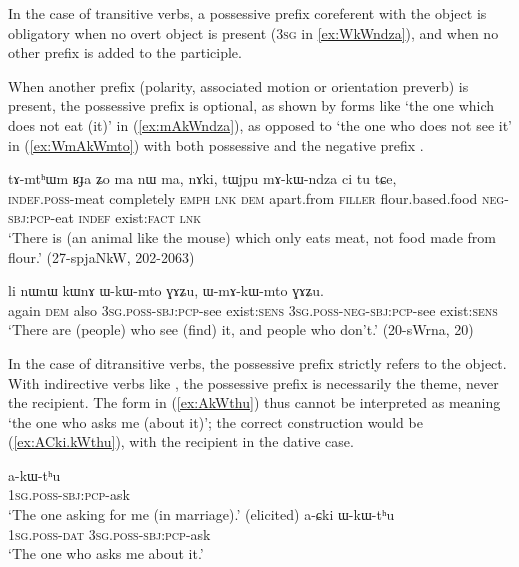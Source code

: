 In the case of transitive verbs, a possessive prefix coreferent with the object is obligatory when no overt object is present (\textsc{3sg}  in \ref{ex:WkWndza}), and when no other prefix is added to the participle.

When another prefix (polarity, associated motion or orientation preverb) is present, the possessive prefix is optional, as shown by forms like  `the one which does not eat (it)' in (\ref{ex:mAkWndza}), as opposed to  `the one who does not see it' in (\ref{ex:WmAkWmto}) with both possessive  and the negative prefix .

 \begin{exe} 
\ex \label{ex:mAkWndza}
\gll  tɤ-mtʰɯm ʁɟa ʑo ma nɯ ma, nɤki, tɯjpu mɤ-kɯ-ndza ci tu tɕe, \\
\textsc{indef}.\textsc{poss}-meat completely \textsc{emph} \textsc{lnk} \textsc{dem} apart.from \textsc{filler} flour.based.food \textsc{neg}-\textsc{sbj}:\textsc{pcp}-eat \textsc{indef} exist:\textsc{fact} \textsc{lnk} \\
\glt  `There is (an animal like the mouse) which only eats meat, not food made from flour.' (27-spjaNkW, 202-2063)
\end{exe}

 \begin{exe} 
\ex \label{ex:WmAkWmto} 
\gll  li nɯnɯ kɯnɤ ɯ-kɯ-mto ɣɤʑu, ɯ-mɤ-kɯ-mto ɣɤʑu. \\
again \textsc{dem} also \textsc{3sg}.\textsc{poss}-\textsc{sbj}:\textsc{pcp}-see exist:\textsc{sens} \textsc{3sg}.\textsc{poss}-\textsc{neg}-\textsc{sbj}:\textsc{pcp}-see exist:\textsc{sens} \\
\glt `There are (people) who see (find) it, and people who don't.' (20-sWrna, 20)
\end{exe}

In the case of ditransitive verbs, the possessive prefix strictly refers to the object. With indirective verbs like , the possessive prefix is necessarily the theme, never the recipient. The form in (\ref{ex:AkWthu}) thus cannot be interpreted as meaning `the one who asks me (about it)'; the correct construction would be (\ref{ex:ACki.kWthu}), with the recipient in the dative case.

\begin{exe}
\ex \label{ex:AkWthu}
\gll a-kɯ-tʰu  \\
\textsc{1sg}.\textsc{poss}-\textsc{sbj}:\textsc{pcp}-ask \\
\glt `The one asking for me (in marriage).' (elicited)
\ex \label{ex:ACki.kWthu}
\gll a-ɕki ɯ-kɯ-tʰu  \\
\textsc{1sg}.\textsc{poss}-\textsc{dat} \textsc{3sg}.\textsc{poss}-\textsc{sbj}:\textsc{pcp}-ask \\ 
\glt `The one who asks me about it.' 
\end{exe}

